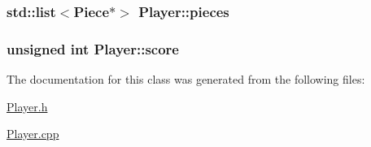 \subsubsection[{\texorpdfstring{pieces}{pieces}}]{\setlength{\rightskip}{0pt plus 5cm}std\+::list$<${\bf Piece}$\ast$$>$ Player\+::pieces\hspace{0.3cm}{\ttfamily [protected]}}\hypertarget{class_player_aae72d6ce61d41bee8d04318baa36b239}{}\label{class_player_aae72d6ce61d41bee8d04318baa36b239}
\subsubsection[{\texorpdfstring{score}{score}}]{\setlength{\rightskip}{0pt plus 5cm}unsigned int Player\+::score\hspace{0.3cm}{\ttfamily [private]}}\hypertarget{class_player_a38a6dafe988a768a435cc0a9fde38e46}{}\label{class_player_a38a6dafe988a768a435cc0a9fde38e46}


The documentation for this class was generated from the following files\+:\begin{DoxyCompactItemize}
\item 
\hyperlink{_player_8h}{Player.\+h}\item 
\hyperlink{_player_8cpp}{Player.\+cpp}\end{DoxyCompactItemize}
